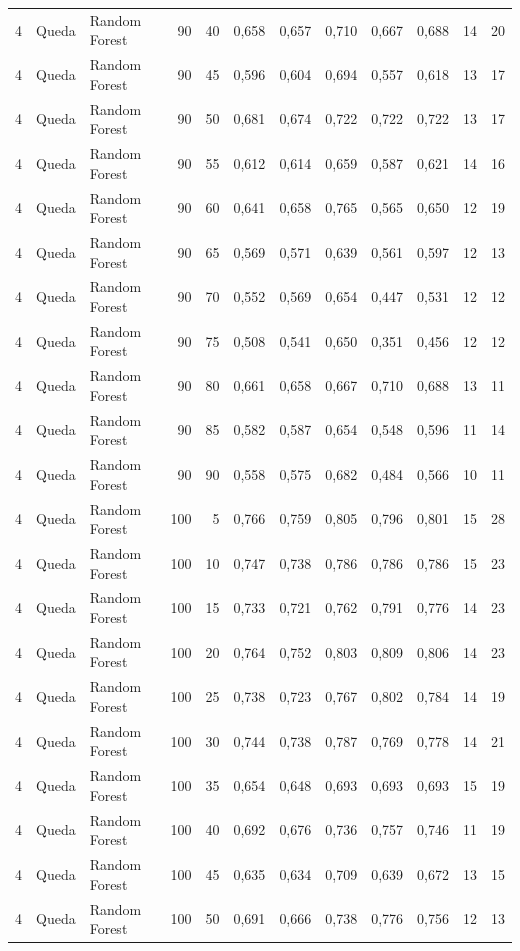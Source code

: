 \begin{longtable}{@{}rllrrrrrrrrr@{}}
4 & Queda & Random Forest & 90 & 40 & 0,658 & 0,657 & 0,710 & 0,667 & 0,688 & 14 & 20 \\
4 & Queda & Random Forest & 90 & 45 & 0,596 & 0,604 & 0,694 & 0,557 & 0,618 & 13 & 17 \\
4 & Queda & Random Forest & 90 & 50 & 0,681 & 0,674 & 0,722 & 0,722 & 0,722 & 13 & 17 \\
4 & Queda & Random Forest & 90 & 55 & 0,612 & 0,614 & 0,659 & 0,587 & 0,621 & 14 & 16 \\
4 & Queda & Random Forest & 90 & 60 & 0,641 & 0,658 & 0,765 & 0,565 & 0,650 & 12 & 19 \\
4 & Queda & Random Forest & 90 & 65 & 0,569 & 0,571 & 0,639 & 0,561 & 0,597 & 12 & 13 \\
4 & Queda & Random Forest & 90 & 70 & 0,552 & 0,569 & 0,654 & 0,447 & 0,531 & 12 & 12 \\
4 & Queda & Random Forest & 90 & 75 & 0,508 & 0,541 & 0,650 & 0,351 & 0,456 & 12 & 12 \\
4 & Queda & Random Forest & 90 & 80 & 0,661 & 0,658 & 0,667 & 0,710 & 0,688 & 13 & 11 \\
4 & Queda & Random Forest & 90 & 85 & 0,582 & 0,587 & 0,654 & 0,548 & 0,596 & 11 & 14 \\
4 & Queda & Random Forest & 90 & 90 & 0,558 & 0,575 & 0,682 & 0,484 & 0,566 & 10 & 11 \\
4 & Queda & Random Forest & 100 & 5 & 0,766 & 0,759 & 0,805 & 0,796 & 0,801 & 15 & 28 \\
4 & Queda & Random Forest & 100 & 10 & 0,747 & 0,738 & 0,786 & 0,786 & 0,786 & 15 & 23 \\
4 & Queda & Random Forest & 100 & 15 & 0,733 & 0,721 & 0,762 & 0,791 & 0,776 & 14 & 23 \\
4 & Queda & Random Forest & 100 & 20 & 0,764 & 0,752 & 0,803 & 0,809 & 0,806 & 14 & 23 \\
4 & Queda & Random Forest & 100 & 25 & 0,738 & 0,723 & 0,767 & 0,802 & 0,784 & 14 & 19 \\
4 & Queda & Random Forest & 100 & 30 & 0,744 & 0,738 & 0,787 & 0,769 & 0,778 & 14 & 21 \\
4 & Queda & Random Forest & 100 & 35 & 0,654 & 0,648 & 0,693 & 0,693 & 0,693 & 15 & 19 \\
4 & Queda & Random Forest & 100 & 40 & 0,692 & 0,676 & 0,736 & 0,757 & 0,746 & 11 & 19 \\
4 & Queda & Random Forest & 100 & 45 & 0,635 & 0,634 & 0,709 & 0,639 & 0,672 & 13 & 15 \\
4 & Queda & Random Forest & 100 & 50 & 0,691 & 0,666 & 0,738 & 0,776 & 0,756 & 12 & 13 \\

\end{longtable}

